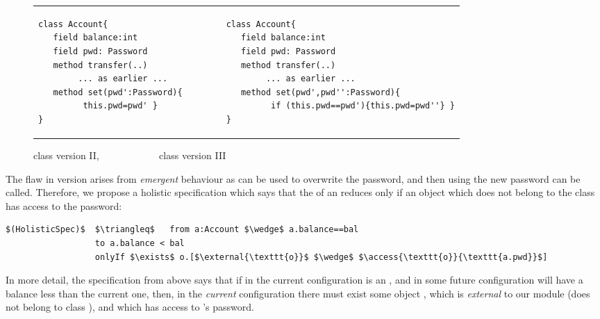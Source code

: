   
 
 \begin{figure}[hbtp]
 \begin{tabular}{lll}
\begin{minipage}{0.35\textwidth}
\begin{lstlisting}[language=chainmail]
class Account{
   field balance:int 
   field pwd: Password 
   method transfer(..) 
        ... as earlier ...
   method set(pwd':Password){
         this.pwd=pwd' }
}   
\end{lstlisting}
\end{minipage}
  &\ \ \  \ \   &
\begin{minipage}{0.50\textwidth}
\begin{lstlisting}[language=chainmail]
class Account{
   field balance:int 
   field pwd: Password 
   method transfer(..) 
        ... as earlier ...
   method set(pwd',pwd'':Password){
         if (this.pwd==pwd'){this.pwd=pwd''} }
}
\end{lstlisting}
\end{minipage} 
 \end{tabular}
  \caption{class  version II,  \ \ \ \ \ \hspace{.7in} \ \ \ \ \ \  class  version III}
 \label{fig:ExampleAccount}
 \end{figure}

 
 The flaw in version {} arises from \emph{emergent} behaviour as  
 can be used to overwrite the
 password, and then using the new password   can be called.
 Therefore, we propose a holistic specification which says that
 the  of an  reduces only if an object which does not belong to the
 class  has access to the password:
 
 \begin{lstlisting}[language = Chainmail, mathescape=true, frame=lines]
$(HolisticSpec)$  $\triangleq$   from a:Account $\wedge$ a.balance==bal
                  to a.balance < bal
                  onlyIf $\exists$ o.[$\external{\texttt{o}}$ $\wedge$ $\access{\texttt{o}}{\texttt{a.pwd}}$]
\end{lstlisting}
 
  
 In more detail, the specification from above says that if in the current
 configuration  is an ,
 and in some future configuration  will have a balance less than the current one, then, in the \emph{current} configuration
 there must exist some object , which is \emph{external} to our module (does not belong to class
 ), and which has access to 's password.
 
